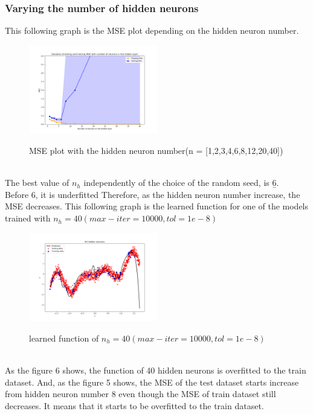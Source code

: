 \documentclass[a4paper]{article}
\begin{document}
\subsubsection{Varying the number of hidden neurons}
This following graph is the MSE plot depending on the hidden neuron number.\\
\begin{figure}[h]
  \includegraphics[width=0.5\textwidth]{ex_1_1_c.png}\\
  \caption{MSE plot with the hidden neuron number(n = [1,2,3,4,6,8,12,20,40])}
\end{figure}\\
The best value of $n_h$ independently of the choice of the random seed, is \b 6.\\
Before 6, it is underfitted Therefore, as the hidden neuron number increase, the MSE decreases.
This following graph is the learned function for one of the models trained with $n_h = 40 (max-iter=10000, tol=1e-8)$\\
\begin{figure}[h]
  \includegraphics[width=0.5\textwidth]{ex_1_1_c_40.png}\\
  \caption{learned function of $n_h = 40 (max-iter=10000, tol=1e-8)$}
\end{figure}\\
As the figure 6 shows, the function of 40 hidden neurons is overfitted to the train dataset. And, as the figure 5 shows, the MSE of the test dataset starts increase from hidden neuron number 8 even though the MSE of train dataset still decreases. It means that it starts to be overfitted to the train dataset.\\
\clearpage
\end{document}
